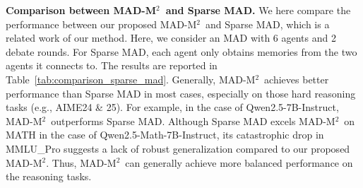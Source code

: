 \documentclass{article} %
\newcommand{\methodname}{MAD-M$^2$}
\theoremstyle{plain}
\begin{document}
\textbf{Comparison between \methodname\ and Sparse MAD.} We here compare the performance between our proposed \methodname\ and Sparse MAD, which is a related work of our method. Here, we consider an MAD with 6 agents and 2 debate rounds. For Sparse MAD, each agent only obtains memories from the two agents it connects to. The results are reported in Table~\ref{tab:comparison_sparse_mad}. Generally, \methodname\ achieves better performance than Sparse MAD in most cases, especially on those hard reasoning tasks (e.g., AIME24 \& 25). For example, in the case of Qwen2.5-7B-Instruct, \methodname\ outperforms Sparse MAD. Although Sparse MAD excels \methodname\ on MATH in the case of Qwen2.5-Math-7B-Instruct, its catastrophic drop in MMLU\_Pro suggests a lack of robust generalization compared to our proposed \methodname. Thus, \methodname\ can generally achieve more balanced performance on the reasoning tasks.

\end{document}
